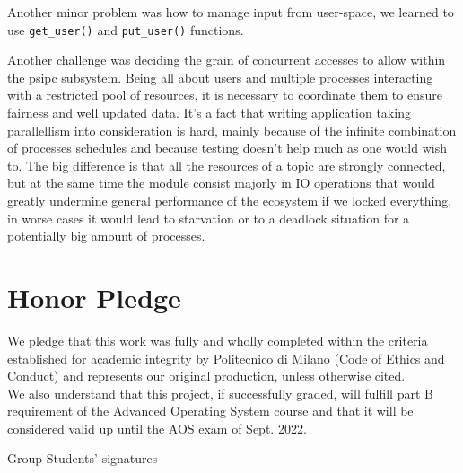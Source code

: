 \documentclass[10pt,a4]{article}
\newcommand{\code}[1]{\texttt{#1}}
\begin{document}
Another minor problem was how to manage input from user-space, we learned to use \code{get\_user()} and \code{put\_user()} functions.

Another challenge was deciding the grain of concurrent accesses to allow within the psipc subsystem. Being all about users and multiple processes interacting with a restricted pool of resources, it is necessary to coordinate them to ensure fairness and well updated data. It's a fact that writing application taking parallellism into consideration is hard, mainly because of the infinite combination of processes schedules and because testing doesn't help much as one would wish to. The big difference is that all the resources of a topic are strongly connected, but at the same time the module consist majorly in IO operations that would greatly undermine general performance of the ecosystem if we locked everything, in worse cases it would lead to starvation or to a deadlock situation for a potentially big amount of processes. %

\section{Honor Pledge}

We pledge that this work was fully and wholly completed within the criteria
established for academic integrity by Politecnico di Milano (Code of Ethics and
Conduct) and represents our original production, unless otherwise cited.\\
We also understand that this project, if successfully graded, will fulfill part B requirement of the
Advanced Operating System course and that it will be considered valid up until
the AOS exam of Sept. 2022. 

\begin{flushright}
Group Students' signatures
\end{flushright}
\end{document}
